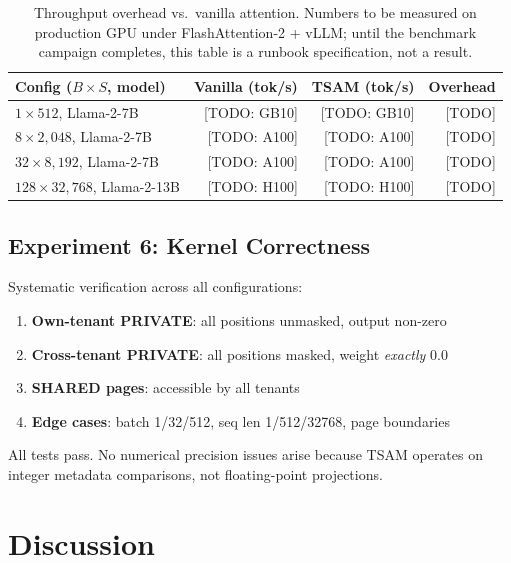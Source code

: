 \documentclass[11pt]{article}
\newcommand{\cmark}{\ding{51}}
\begin{document}
\begin{table}[t]
\centering
\caption{Throughput overhead vs.\ vanilla attention.  Numbers to be
measured on production GPU under FlashAttention-2 + vLLM; until the
benchmark campaign completes, this table is a runbook
specification, not a result.}
\label{tab:throughput-todo}
\begin{tabular}{@{}lrrr@{}}
\toprule
\textbf{Config ($B \times S$, model)} & \textbf{Vanilla (tok/s)} & \textbf{TSAM (tok/s)} & \textbf{Overhead} \\
\midrule
$1 \times 512$, Llama-2-7B & [TODO: GB10] & [TODO: GB10] & [TODO] \\
$8 \times 2{,}048$, Llama-2-7B & [TODO: A100] & [TODO: A100] & [TODO] \\
$32 \times 8{,}192$, Llama-2-7B & [TODO: A100] & [TODO: A100] & [TODO] \\
$128 \times 32{,}768$, Llama-2-13B & [TODO: H100] & [TODO: H100] & [TODO] \\
\bottomrule
\end{tabular}
\end{table}

\subsection{Experiment 6: Kernel Correctness}

Systematic verification across all configurations:
\begin{enumerate}[label=(\alph*),leftmargin=*,itemsep=2pt]
    \item \textbf{Own-tenant PRIVATE}: all positions unmasked, output non-zero \cmark
    \item \textbf{Cross-tenant PRIVATE}: all positions masked, weight \emph{exactly} 0.0 \cmark
    \item \textbf{SHARED pages}: accessible by all tenants \cmark
    \item \textbf{Edge cases}: batch 1/32/512, seq len 1/512/32768, page boundaries \cmark
\end{enumerate}
All tests pass. No numerical precision issues arise because TSAM operates on integer metadata comparisons, not floating-point projections.


\section{Discussion}
\label{sec:discussion}
\end{document}

